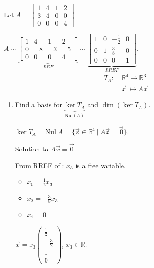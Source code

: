 \documentclass[11pt,fleqn]{book} %
\begin{document}
\begin{example}
{~~~}

    Let $A = \begin{bmatrix} 1&4&1&2 \\ 3&4&0&0 \\ 0&0&0&4 \end{bmatrix}$. 
    
    $A \sim \underbrace{ \begin{bmatrix} 1&4&1&2\\0&-8&-3&-5\\0&0&0&4 \end{bmatrix} }_{REF} \sim \underbrace{ \begin{bmatrix} 1&0&-\frac{1}{2}&0\\0&1&\frac{3}{8}&0\\0&0&0&1 \end{bmatrix}}_{RREF}$. 
    \begin{align*}
        T_A:
        &~\mathbb{R}^4 \to \mathbb{R}^3
        \\
        &~\overrightarrow{x} ~\mapsto A\overrightarrow{x}
    \end{align*}
    
    \begin{enumerate}
        \item Find a basis for $\underbrace{\ker T_A}_{\mathrm{Nul}(A)}$ and $\dim\left( \ker T_A \right)$. 
        
        $\ker T_A = \mathrm{Nul}~A = \{ \overrightarrow{x} \in \mathbb{R}^4 ~|~ A\overrightarrow{x} = \overrightarrow{0} \}$. 
        
        Solution to $A\overrightarrow{x} = \overrightarrow{0}$.
        
        From RREF of : $x_3$ is a free variable. 
        \begin{itemize}
            \item ${x_1} = \frac{1}{2}{x_3}$
            \item ${x_2} = -\frac{3}{8}{x_3}$
            \item $x_4 = 0$
        \end{itemize}
        
        $\overrightarrow{x} = {x_3} \begin{pmatrix} \frac{1}{2} \\ -\frac{3}{2} \\ 1 \\ 0 \end{pmatrix}$, $x_3 \in \mathbb{R}$. 
        

\end{enumerate}
\end{example}
\end{document}
